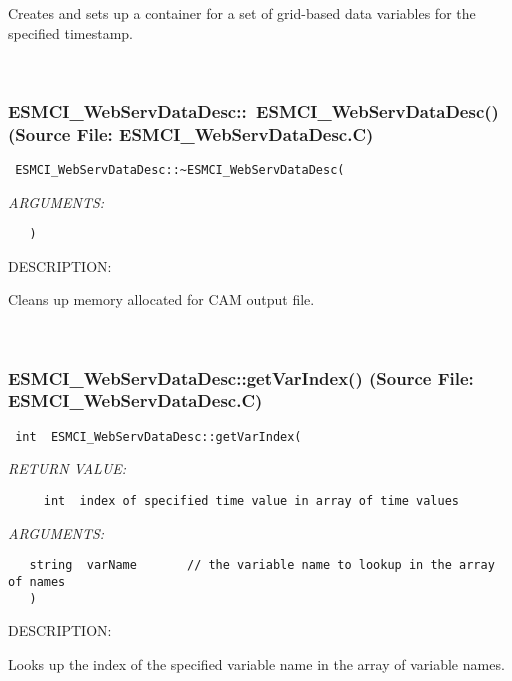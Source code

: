       Creates and sets up a container for a set of grid-based data variables
      for the specified timestamp.
   
 
\mbox{}\hrulefill\
 
\subsubsection{ESMCI\_WebServDataDesc::~ESMCI\_WebServDataDesc() (Source File: ESMCI\_WebServDataDesc.C)}


  
\begin{verbatim} ESMCI_WebServDataDesc::~ESMCI_WebServDataDesc(\end{verbatim}{\em ARGUMENTS:}
\begin{verbatim}   )\end{verbatim}
{\sf DESCRIPTION:\\ }


      Cleans up memory allocated for CAM output file.
   
 
\mbox{}\hrulefill\
 
\subsubsection{ESMCI\_WebServDataDesc::getVarIndex() (Source File: ESMCI\_WebServDataDesc.C)}


  
\begin{verbatim} int  ESMCI_WebServDataDesc::getVarIndex(\end{verbatim}{\em RETURN VALUE:}
\begin{verbatim}     int  index of specified time value in array of time values\end{verbatim}{\em ARGUMENTS:}
\begin{verbatim}   string  varName       // the variable name to lookup in the array of names
   )\end{verbatim}
{\sf DESCRIPTION:\\ }


      Looks up the index of the specified variable name in the array of
      variable names.
   
 
